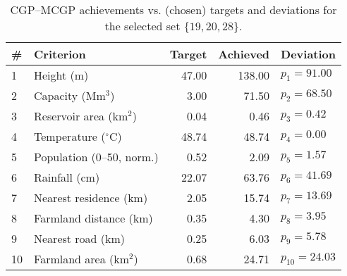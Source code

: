 \begin{table}[htbp]
\centering
\caption{CGP--MCGP achievements vs. (chosen) targets and deviations for the selected set $\{19,20,28\}$.}
\label{tab:cgpMCGPAchievementVsTarget}
\begin{tabular}{llrrl}
\toprule
\# & Criterion & Target & Achieved & Deviation \\
\midrule
1  & Height (m)                   & 47.00  & 138.00 & $p_1=91.00$ \\
2  & Capacity (Mm$^3$)            & 3.00   & 71.50  & $p_2=68.50$ \\
3  & Reservoir area (km$^2$)      & 0.04   & 0.46   & $p_3=0.42$ \\
4  & Temperature ($^{\circ}$C)    & 48.74  & 48.74  & $p_4=0.00$ \\
5  & Population (0--50, norm.)    & 0.52   & 2.09   & $p_5=1.57$ \\
6  & Rainfall (cm)                & 22.07  & 63.76  & $p_6=41.69$ \\
7  & Nearest residence (km)       & 2.05   & 15.74  & $p_7=13.69$ \\
8  & Farmland distance (km)       & 0.35   & 4.30   & $p_8=3.95$ \\
9  & Nearest road (km)            & 0.25   & 6.03   & $p_9=5.78$ \\
10 & Farmland area (km$^2$)       & 0.68   & 24.71  & $p_{10}=24.03$ \\
\bottomrule
\end{tabular}
\end{table} 